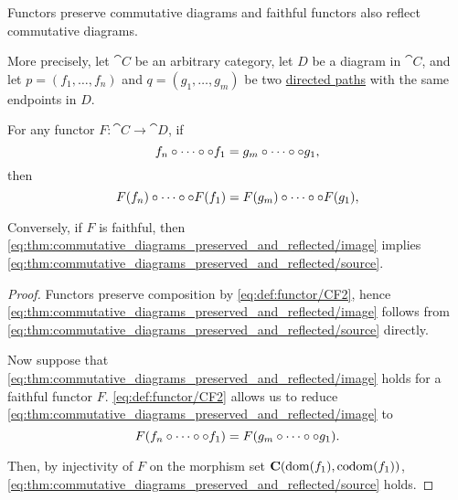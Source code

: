 \begin{proposition}\label{thm:commutative_diagrams_preserved_and_reflected}
  Functors preserve commutative diagrams and faithful functors also reflect commutative diagrams.

  More precisely, let \( \cat{C} \) be an arbitrary category, let \( D \) be a diagram in \( \cat{C} \), and let \( p = (f_1, \ldots, f_n) \) and \( q = (g_1, \ldots, g_m) \) be two \hyperref[def:quiver_path/directed]{directed paths} with the same endpoints in \( D \).

  For any functor \( F: \cat{C} \to \cat{D} \), if
  \begin{equation}\label{eq:thm:commutative_diagrams_preserved_and_reflected/source}
    f_n \bincirc \cdots \bincirc \bincirc f_1 = g_m \bincirc \cdots \bincirc \bincirc g_1,
  \end{equation}
  then
  \begin{equation}\label{eq:thm:commutative_diagrams_preserved_and_reflected/image}
    F(f_n) \bincirc \cdots \bincirc \bincirc F(f_1) = F(g_m) \bincirc \cdots \bincirc \bincirc F(g_1),
  \end{equation}

  Conversely, if \( F \) is faithful, then \eqref{eq:thm:commutative_diagrams_preserved_and_reflected/image} implies \eqref{eq:thm:commutative_diagrams_preserved_and_reflected/source}.
\end{proposition}
\begin{proof}
  Functors preserve composition by \ref{eq:def:functor/CF2}, hence \eqref{eq:thm:commutative_diagrams_preserved_and_reflected/image} follows from \eqref{eq:thm:commutative_diagrams_preserved_and_reflected/source} directly.

  Now suppose that \eqref{eq:thm:commutative_diagrams_preserved_and_reflected/image} holds for a faithful functor \( F \). \ref{eq:def:functor/CF2} allows us to reduce \eqref{eq:thm:commutative_diagrams_preserved_and_reflected/image} to
  \begin{equation*}
    F(f_n \bincirc \cdots \bincirc \bincirc f_1) = F(g_m \bincirc \cdots \bincirc \bincirc g_1).
  \end{equation*}

  Then, by injectivity of \( F \) on the morphism set \( \operatorname{\mathbf{C}}(\operatorname{dom}(f_1), \operatorname*{co\negthinspace\operatorname{dom}}(f_1)) \), \eqref{eq:thm:commutative_diagrams_preserved_and_reflected/source} holds.
\end{proof}

